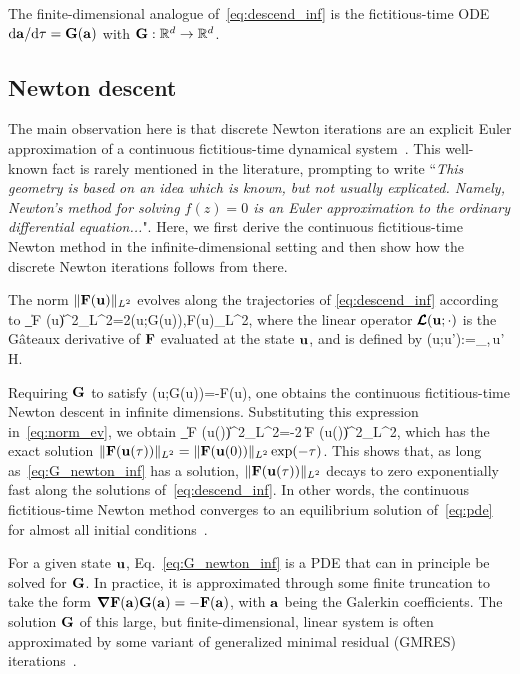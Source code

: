 \documentclass{article}
\begin{document}
The finite-dimensional analogue of~\eqref{eq:descend_inf} is the fictitious-time ODE
$\mbox d\mathbf a/\mbox d\tau=\mathbf G(\mathbf a)$
with $\mathbf G:\mathbb R^d\to\mathbb R^d$.

\subsection{Newton descent}\label{sec:descend_inf}
The main observation here is that discrete Newton iterations are
an explicit Euler approximation of a continuous fictitious-time dynamical
system~\citep{saupe88}.
This well-known fact is
rarely mentioned in the literature, prompting
\cite{smale81} to write ``\textit{This geometry is based on an idea which is known,
but not usually explicated. Namely, Newton's method for
solving $f(z)=0$ is an Euler approximation to the ordinary differential equation...}".
Here, we first derive the continuous fictitious-time Newton method in the infinite-dimensional setting
and then show how the discrete Newton iterations follows from there.

The norm $\|\mathbf F
(\mathbf u)\|_{L^2}$ evolves along the trajectories of \eqref{eq:descend_inf} according to
\beq
\partial_\tau \|\vc F
(\vc u)\|^2_{L^2}=2\langle {}(\vc u;\vc G(\vc u)),\vc F(\vc u)\rangle_{L^2},
\label{eq:norm_ev}
\eeq
where the linear
operator $\pmb{\mathcal L}(\mathbf u;\cdot)$ is the G\^ateaux derivative of $\mathbf F$ evaluated
at the state $\mathbf u$, and is defined by
\beq
{}(\vc u;\vc u'):=\lim_{\epsilon{}},\quad \forall\,\vc u' \in\mathcal H.
\eeq

Requiring  $\mathbf G$ to satisfy
\beq
{}(\vc u;\vc G(\vc u))=-\vc F(\vc u),
\label{eq:G_newton_inf}
\eeq
one obtains the continuous fictitious-time Newton descent in infinite dimensions.
Substituting this expression in~\eqref{eq:norm_ev}, we obtain
\beq
\partial_\tau \|\vc F
(\vc u(\tau))\|^2_{L^2}=-2 \|\vc F
(\vc u(\tau))\|^2_{L^2},
\eeq
which has the exact solution $\|\mathbf F(\mathbf u(\tau))\|_{L^2}=\|\mathbf F(\mathbf u(0))\|_{L^2}\exp(-\tau)$.
This shows that, as long as~\eqref{eq:G_newton_inf} has
a solution, $\|\mathbf F(\mathbf u(\tau))\|_{L^2}$ decays to zero exponentially fast
along the solutions of~\eqref{eq:descend_inf}. In other words, the continuous fictitious-time
Newton method converges to an equilibrium solution of~\eqref{eq:pde} for
almost all initial conditions~\citep{saupe88,CvitLanCrete02,lanVar1}.

For a given state $\mathbf u$, Eq.~\eqref{eq:G_newton_inf} is a PDE that can in principle be solved
for $\mathbf G$. In practice, it is approximated through some finite truncation
to take the form $\mbox{\boldmath $\nabla$}\mathbf F(\mathbf a)\mathbf G(\mathbf a)=-\mathbf F(\mathbf a)$, with $\mathbf a$ being the
Galerkin coefficients.
The solution $\mathbf G$ of this large, but finite-dimensional, linear system is often
approximated by some variant of
generalized minimal residual (GMRES) iterations~\citep{Trefethen97}.
\end{document}
